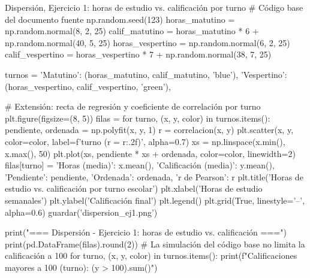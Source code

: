 \documentclass[11pt,letterpaper]{article}
\begin{document}
\begin{codigo}[label=cod:disp1]{Dispersión, Ejercicio 1: horas de estudio vs. calificación por turno}
# Código base del documento fuente
np.random.seed(123)
horas_matutino = np.random.normal(8, 2, 25)
calif_matutino = horas_matutino * 6 + np.random.normal(40, 5, 25)
horas_vespertino = np.random.normal(6, 2, 25)
calif_vespertino = horas_vespertino * 7 + np.random.normal(38, 7, 25)

turnos = {
    'Matutino': (horas_matutino, calif_matutino, 'blue'),
    'Vespertino': (horas_vespertino, calif_vespertino, 'green'),
}

# Extensión: recta de regresión y coeficiente de correlación por turno
plt.figure(figsize=(8, 5))
filas = {}
for turno, (x, y, color) in turnos.items():
    pendiente, ordenada = np.polyfit(x, y, 1)
    r = correlacion(x, y)
    plt.scatter(x, y, color=color, label=f'{turno} (r = {r:.2f})', alpha=0.7)
    xs = np.linspace(x.min(), x.max(), 50)
    plt.plot(xs, pendiente * xs + ordenada, color=color, linewidth=2)
    filas[turno] = {'Horas (media)': x.mean(), 'Calificación (media)': y.mean(),
                    'Pendiente': pendiente, 'Ordenada': ordenada, 'r de Pearson': r}
plt.title('Horas de estudio vs. calificación por turno escolar')
plt.xlabel('Horas de estudio semanales')
plt.ylabel('Calificación final')
plt.legend()
plt.grid(True, linestyle='--', alpha=0.6)
guardar('dispersion_ej1.png')

print("\n=== Dispersión - Ejercicio 1: horas de estudio vs. calificación ===")
print(pd.DataFrame(filas).round(2))
# La simulación del código base no limita la calificación a 100
for turno, (x, y, color) in turnos.items():
    print(f"Calificaciones mayores a 100 ({turno}): {(y > 100).sum()}")
\end{codigo}
\end{document}
